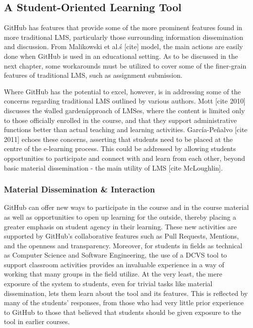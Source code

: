\subsection{A Student-Oriented Learning Tool}
GitHub has features that provide some of the more prominent features found in more traditional LMS, particularly those surrounding information dissemination and discussion. From Malikowski et al.\'s [cite] model, the main actions are easily done when GitHub is used in an educational setting. As to be discussed in the next chapter, some workarounds must be utilized to cover some of the finer-grain features of traditional LMS, such as assignment submission.

Where GitHub has the potential to excel, however, is in addressing some of the concerns regarding traditional LMS outlined by various authors. Mott [cite 2010] discusses the \'walled garden\' approach of LMSes, where the content is limited only to those officially enrolled in the course, and that they support administrative functions better than actual teaching and learning activities. García-Peñalvo [cite 2011] echoes these concerns, asserting that students need to be placed at the centre of the e-learning process. This could be addressed by allowing students opportunities to participate and connect with and learn from each other, beyond basic material dissemination - the main utility of LMS [cite McLoughlin].

\subsubsection{Material Dissemination \& Interaction}
GitHub can offer new ways to participate in the course and in the course material as well as opportunities to open up learning for the outside, thereby placing a greater emphasis on student agency in their learning. These new activities are supported by GitHub's collaborative features such as Pull Requests, Mentions, and the openness and transparency. Moreover, for students in fields as technical as Computer Science and Software Engineering, the use of a DCVS tool to support classroom activities provides an invaluable experience in a way of working that many groups in the field utilize. At the very least, the mere exposure of the system to students, even for trivial tasks like material dissemination, lets them learn about the tool and its features. This is reflected by many of the students' responses, from those who had very little prior experience to GitHub to those that believed that students should be given exposure to the tool in earlier courses.

